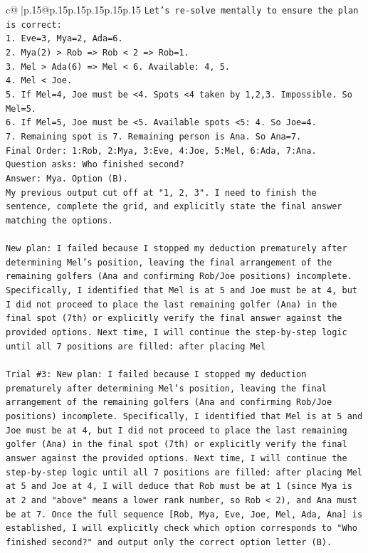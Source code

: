 \documentclass{article}
\begin{document}
{\begin{supertabular}{c@{$\;$}|p{.15\linewidth}@{}p{.15\linewidth}p{.15\linewidth}p{.15\linewidth}p{.15\linewidth}p{.15\linewidth}}
{{{\texttt{Let's re{-}solve mentally to ensure the plan is correct:} \\
\texttt{1. Eve=3, Mya=2, Ada=6.} \\
\texttt{2. Mya(2) > Rob => Rob < 2 => Rob=1.} \\
\texttt{3. Mel > Ada(6) => Mel < 6. Available: 4, 5.} \\
\texttt{4. Mel < Joe.} \\
\texttt{5. If Mel=4, Joe must be <4. Spots <4 taken by 1,2,3. Impossible. So Mel=5.} \\
\texttt{6. If Mel=5, Joe must be <5. Available spots <5: 4. So Joe=4.} \\
\texttt{7. Remaining spot is 7. Remaining person is Ana. So Ana=7.} \\
\texttt{Final Order: 1:Rob, 2:Mya, 3:Eve, 4:Joe, 5:Mel, 6:Ada, 7:Ana.} \\
\texttt{Question asks: Who finished second?} \\
\texttt{Answer: Mya. Option (B).} \\
\texttt{My previous output cut off at "1, 2, 3". I need to finish the sentence, complete the grid, and explicitly state the final answer matching the options.} \\
\\ 
\texttt{New plan: I failed because I stopped my deduction prematurely after determining Mel's position, leaving the final arrangement of the remaining golfers (Ana and confirming Rob/Joe positions) incomplete. Specifically, I identified that Mel is at 5 and Joe must be at 4, but I did not proceed to place the last remaining golfer (Ana) in the final spot (7th) or explicitly verify the final answer against the provided options. Next time, I will continue the step{-}by{-}step logic until all 7 positions are filled: after placing Mel} \\
\\ 
\texttt{Trial \#3: New plan: I failed because I stopped my deduction prematurely after determining Mel's position, leaving the final arrangement of the remaining golfers (Ana and confirming Rob/Joe positions) incomplete. Specifically, I identified that Mel is at 5 and Joe must be at 4, but I did not proceed to place the last remaining golfer (Ana) in the final spot (7th) or explicitly verify the final answer against the provided options. Next time, I will continue the step{-}by{-}step logic until all 7 positions are filled: after placing Mel at 5 and Joe at 4, I will deduce that Rob must be at 1 (since Mya is at 2 and "above" means a lower rank number, so Rob < 2), and Ana must be at 7. Once the full sequence {[}Rob, Mya, Eve, Joe, Mel, Ada, Ana{]} is established, I will explicitly check which option corresponds to "Who finished second?" and output only the correct option letter (B).} \\
}}}
\end{supertabular}}
\end{document}
